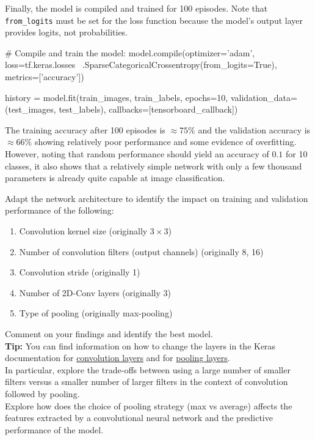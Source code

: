 Finally, the model is compiled and trained for 100 episodes. Note that \texttt{from\_logits} must be set for the loss function because the model's output layer provides logits, not probabilities.

\begin{pythoncode}
# Compile and train the model:
model.compile(optimizer='adam',
    loss=tf.keras.losses \
        .SparseCategoricalCrossentropy(from_logits=True),
    metrics=['accuracy'])

history = model.fit(train_images, train_labels, 
    epochs=10, 
    validation_data=(test_images, test_labels),
    callbacks=[tensorboard_callback])
\end{pythoncode}

The training accuracy after 100 episodes is $\approx 75\%$ and the validation accuracy is $\approx 66\%$ showing relatively poor performance and some evidence of overfitting. However, noting that random performance should yield an accuracy of $0.1$ for 10 classes, it also shows that a relatively simple network with only a few thousand parameters is already quite capable at image classification. 

\begin{exercisebox}
Adapt the network architecture to identify the impact on training and validation performance of the following:
   \begin{enumerate}
      \item Convolution kernel size (originally $3 \times 3$)
      \item Number of convolution filters (output channels) (originally 8, 16)
      \item Convolution stride (originally 1)
      \item Number of 2D-Conv layers (originally 3)
      \item Type of pooling (originally max-pooling)
   \end{enumerate} 
Comment on your findings and identify the best model.\\

\textbf{Tip:} You can find information on how to change the layers in the Keras documentation for \href{https://keras.io/2.16/api/layers/convolution_layers/}{convolution layers} and for \href{https://keras.io/2.16/api/layers/pooling_layers/}{pooling layers}. \\

In particular, explore the trade-offs between using a large number of smaller filters versus a smaller number of larger filters in the context of convolution followed by pooling. \\

Explore how does the choice of pooling strategy (max vs average) affects the features extracted by a convolutional neural network and the predictive performance of the model.\\
\end{exercisebox}

